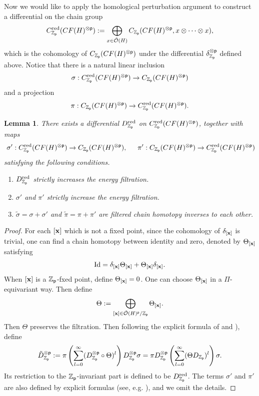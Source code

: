 \documentclass[reqno, 10pt]{amsart}
\numberwithin{equation}{section}
\numberwithin{equation}{section}
\newtheorem{lemma}[thm]{Lemma}
\theoremstyle{definition}
\theoremstyle{remark}
\newcommand{\beq}{\begin{equation}}
\newcommand{\eeq}{\end{equation}}
\newcommand{\beqn}{\begin{equation*}}
\newcommand{\eeqn}{\end{equation*}}
\newcommand{\mb}{\mathbb}
\newcommand{\mc}{\mathcal}
\newcommand{\p}{{\sf p}}
\newcommand{\zp}{{{\mb Z}_{\sf p}}}
\begin{document}
Now we would like to apply the homological perturbation argument to construct a differential on the chain group
\beq\label{reduced_complex}
C_{\zp}^{\rm red}(CF(H)^{\otimes \p}):= \bigoplus_{ x\in \tilde {\mc O}(H)} C_{\zp}(CF(H)^{\otimes \p}, x\otimes \cdots \otimes x),
\eeq
which is the cohomology of $C_{\zp}(CF(H)^{\otimes \p})$ under the differential $\delta_{\zp}^{\otimes \p}$ defined above. Notice that there is a natural linear inclusion
\beqn
\sigma: C_{\zp}^{\rm red}(CF(H)^{\otimes \p}) \to C_{\zp}(CF(H)^{\otimes \p})
\eeqn
and a projection
\beqn
\pi: C_{\zp}(CF(H)^{\otimes \p}) \to C_{\zp}^{\rm red}(CF(H)^{\otimes \p}).
\eeqn

\begin{lemma}\label{lemma_homological_perturbation_1}
There exists a differential $D_{\zp}^{\rm red}$ on $C_{\zp}^{\rm red}(CF(H)^{\otimes \p})$, together with maps
\begin{align*}
&\ \sigma': C_{\zp}^{\rm red}(CF(H)^{\otimes \p}) \to C_{\zp}(CF(H)^{\otimes \p}),\ &\ \pi': C_{\zp}(CF(H)^{\otimes \p}) \to C_{\zp}^{\rm red}( CF(H)^{\otimes \p})
\end{align*}
satisfying the following conditions.
\begin{enumerate}

\item $D_{\zp}^{\rm red}$ strictly increases the energy filtration.

\item $\sigma'$ and $\pi'$ strictly increase the energy filtration.

\item $\tilde \sigma =\sigma +\sigma'$ and $\tilde \pi = \pi + \pi'$ are filtered chain homotopy inverses to each other.
\end{enumerate}
\end{lemma}

\begin{proof}
For each $[{\bf x}]$ which is not a fixed point, since the cohomology of $\delta_{[{\bf x}]}$ is trivial, one can find a chain homotopy between identity and zero, denoted by $\Theta_{[{\bf x}]}$ satisfying
\beqn
{\rm Id} = \delta_{[{\bf x}]} \Theta_{[{\bf x}]} + \Theta_{[{\bf x}]} \delta_{[{\bf x}]}.
\eeqn
When $[{\bf x}]$ is a $\zp$-fxed point, define $\Theta_{[{\bf x}]} = 0$. One can choose $\Theta_{[{\bf x}]}$ in a $\Pi$-equivariant way. Then define
\beqn
\Theta:= \bigoplus_{[{\bf x}]\in \tilde {\mc O}(H)^{\p}/ \zp} \Theta_{[{\bf x}]}.
\eeqn
Then $\Theta$ preserves the filtration. Then following the explicit formula of \cite{Huebschman_Kadeishvili} and \cite{Markl_perturbation}), define
\beqn
\tilde D_{\zp}^{\otimes \p}:= \pi \left( \sum_{l=0}^\infty (D_{\zp}^{\otimes \p} \circ \Theta )^l \right) D_{\zp}^{\otimes \p} \sigma = \pi D_{\zp}^{\otimes \p} \left( \sum_{l=0}^\infty (\Theta D_{\zp} )^l \right) \sigma.
\eeqn
Its restriction to the $\zp$-invariant part is defined to be $D_{\zp}^{\rm red}$. The terms $\sigma'$ and $\pi'$ are also defined by explicit formulas (see, e.g. \cite[Appendix B]{BSWX}), and we omit the details.
\end{proof}
\end{document}
